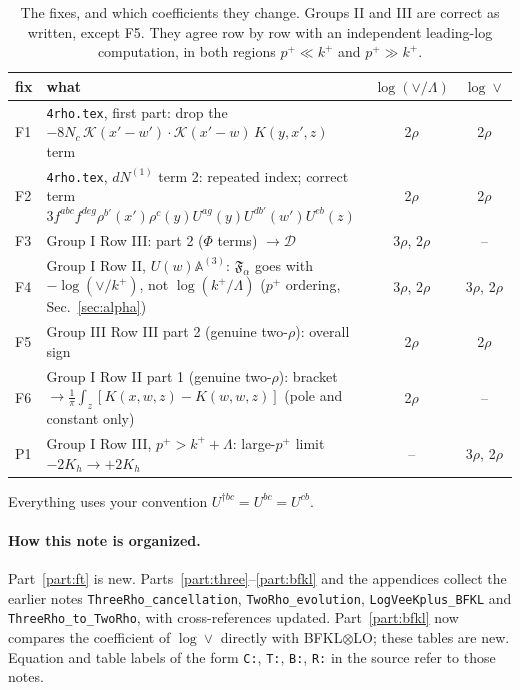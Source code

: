 \documentclass[10pt]{article}
\numberwithin{equation}{section}
\newcommand{\KK}{\mathcal K}
\newcommand{\lab}[1]{\texttt{#1}}
\begin{document}
\begin{table}[h]
\centering\small
\begin{tabular}{@{}l >{\raggedright\arraybackslash}p{} c c@{}}
fix & what & $\log(\vee/\Lambda)$ & $\log\vee$\\ \hline
F1 & \texttt{4rho.tex}, first part: drop the $-8N_c\,\KK(x'-w')\cdot\KK(x'-w)\,K(y,x',z)$ term & 2$\rho$ & 2$\rho$\\
F2 & \texttt{4rho.tex}, $dN^{(1)}$ term 2: repeated index; correct term $3f^{abc}f^{deg}\rho^{b'}(x')\rho^c(y)U^{ag}(y)U^{db'}(w')U^{eb}(z)$ & 2$\rho$ & 2$\rho$\\
F3 & Group I Row III: part 2 ($\Phi$ terms) $\to\mathcal D$ & 3$\rho$, 2$\rho$ & --\\
F4 & Group I Row II, $U(w)\mathbb A^{(3)}$: $\mathfrak F_\alpha$ goes with $-\log(\vee/k^+)$, not $\log(k^+/\Lambda)$ ($p^+$ ordering, Sec.~\ref{sec:alpha}) & 3$\rho$, 2$\rho$ & 3$\rho$, 2$\rho$\\
F5 & Group III Row III part 2 (genuine two-$\rho$): overall sign & 2$\rho$ & 2$\rho$\\
F6 & Group I Row II part 1 (genuine two-$\rho$): bracket $\to\frac1\pi\int_z[K(x,w,z)-K(w,w,z)]$ (pole and constant only) & 2$\rho$ & --\\
P1 & Group I Row III, $p^+>k^++\Lambda$: large-$p^+$ limit $-2K_h\to+2K_h$ & -- & 3$\rho$, 2$\rho$\\
\end{tabular}
\caption{The fixes, and which coefficients they change. Groups II and III are correct as written, except F5. They agree row by row with an independent leading-log computation, in both regions $p^+\ll k^+$ and $p^+\gg k^+$.}
\label{tab:fixes}
\end{table}
Everything uses your convention $U^{\dagger bc}=U^{bc}=U^{cb}$.

\paragraph{How this note is organized.} Part~\ref{part:ft} is new. Parts~\ref{part:three}--\ref{part:bfkl} and the appendices collect the earlier notes \texttt{ThreeRho\_cancellation}, \texttt{TwoRho\_evolution}, \texttt{LogVeeKplus\_BFKL} and \texttt{ThreeRho\_to\_TwoRho}, with cross-references updated. Part~\ref{part:bfkl} now compares the coefficient of $\log\vee$ directly with BFKL$\otimes$LO; these tables are new. Equation and table labels of the form \lab{C:}, \lab{T:}, \lab{B:}, \lab{R:} in the source refer to those notes.
\end{document}
